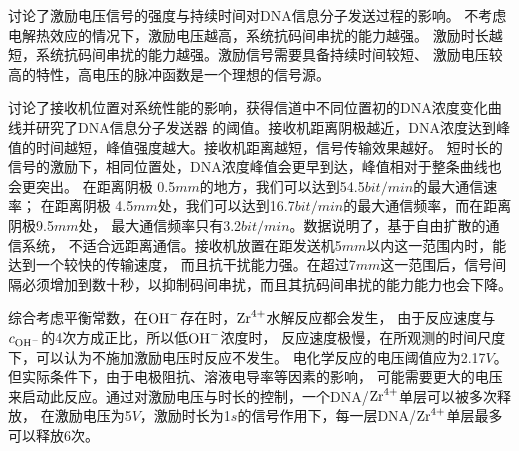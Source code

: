 讨论了激励电压信号的强度与持续时间对DNA信息分子发送过程的影响。
不考虑电解热效应的情况下，激励电压越高，系统抗码间串扰的能力越强。
激励时长越短，系统抗码间串扰的能力越强。激励信号需要具备持续时间较短、
激励电压较高的特性，高电压的脉冲函数是一个理想的信号源。

讨论了接收机位置对系统性能的影响，获得信道中不同位置初的DNA浓度变化曲线并研究了DNA信息分子发送器
的阈值。接收机距离阴极越近，DNA浓度达到峰值的时间越短，峰值强度越大。接收机距离越短，信号传输效果越好。
短时长的信号的激励下，相同位置处，DNA浓度峰值会更早到达，峰值相对于整条曲线也会更突出。
在距离阴极 0.5$mm$的地方，我们可以达到54.5$bit/min$的最大通信速率；
在距离阴极 4.5$mm$处，我们可以达到16.7$bit/min$的最大通信频率，而在距离阴极9.5$mm$处，
最大通信频率只有3.2$bit/min$。数据说明了，基于自由扩散的通信系统，
不适合远距离通信。接收机放置在距发送机5$mm$以内这一范围内时，能达到一个较快的传输速度，
而且抗干扰能力强。在超过7$mm$这一范围后，信号间隔必须增加到数十秒，以抑制码间串扰，而且其抗码间串扰的能力能力也会下降。

综合考虑平衡常数，在$\ce{OH-}$存在时，$\ce{Zr^4+}$水解反应都会发生，
由于反应速度与$c_{\ce{OH-}}$的4次方成正比，所以低$\ce{OH-}$浓度时，
反应速度极慢，在所观测的时间尺度下，可以认为不施加激励电压时反应不发生。
电化学反应的电压阈值应为2.17$V$。但实际条件下，由于电极阻抗、溶液电导率等因素的影响，
可能需要更大的电压来启动此反应。通过对激励电压与时长的控制，一个DNA/$\ce{Zr^4+}$单层可以被多次释放，
在激励电压为5$V$，激励时长为1$s$的信号作用下，每一层DNA/$\ce{Zr^4+}$单层最多可以释放6次。
